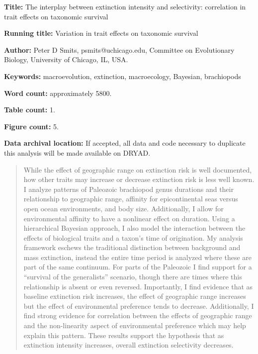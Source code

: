 \documentclass{article}
\begin{document}
\linenumbers
\modulolinenumbers[2]


\begin{titlepage}
  \begin{large}
    \textbf{Title:} The interplay between extinction intensity and selectivity: correlation in trait effects on taxonomic survival
  \end{large}

  \textbf{Running title:} Variation in trait effects on taxonomic survival

  \textbf{Author:} Peter D Smits, psmits@uchicago.edu, Committee on Evolutionary Biology, University of Chicago, IL, USA.

  \textbf{Keywords:} macroevolution, extinction, macroecology, Bayesian, brachiopods

  \textbf{Word count:} approximately 5800.
  
  \textbf{Table count:} 1.
 
  \textbf{Figure count:} 5.

  \textbf{Data archival location:} If accepted, all data and code necessary to duplicate this analysis will be made available on DRYAD.

\end{titlepage}

\begin{abstract}
  While the effect of geographic range on extinction risk is well documented, how other traits may increase or decrease extinction risk is less well known. I analyze patterns of Paleozoic brachiopod genus durations and their relationship to geographic range, affinity for epicontinental seas versus open ocean environments, and body size. Additionally, I allow for environmental affinity to have a nonlinear effect on duration. Using a hierarchical Bayesian approach, I also model the interaction between the effects of biological traits and a taxon's time of origination. My analysis framework eschews the traditional distinction between background and mass extinction, instead the entire time period is analyzed where these are part of the same continuum. For parts of the Paleozoic I find support for a ``survival of the generalists'' scenario, though there are times where this relationship is absent or even reversed. Importantly, I find evidence that as baseline extinction risk increases, the effect of geographic range increases but the effect of environmental preference tends to decrease. Additionally, I find strong evidence for correlation between the effects of geographic range and the non-linearity aspect of environmental preference which may help explain this pattern. These results support the hypothesis that as extinction intensity increases, overall extinction selectivity decreases.
\end{abstract}
\end{document}
